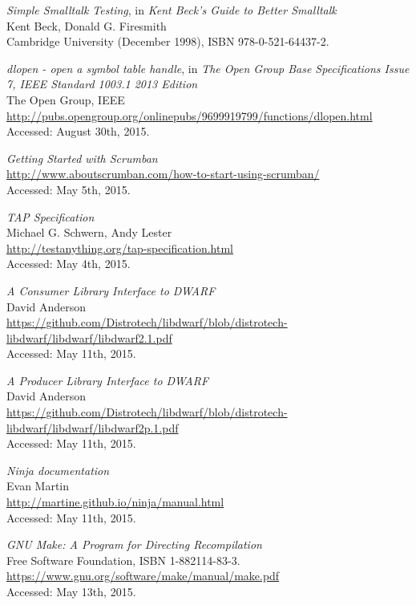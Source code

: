 \begin{thebibliography}{99}
		\emph{Simple Smalltalk Testing}, in \emph{Kent Beck's Guide to Better
		Smalltalk} \\
		Kent Beck, Donald G. Firesmith \\
		Cambridge University (December 1998), ISBN 978-0-521-64437-2.

		\emph{dlopen - open a symbol table handle}, in \emph{The Open Group Base
		Specifications Issue 7, IEEE Standard 1003.1 2013 Edition} \\
		The Open Group, IEEE \\
		\url{http://pubs.opengroup.org/onlinepubs/9699919799/functions/dlopen.html}	\\
		Accessed: August 30th, 2015.

		\emph{Getting Started with Scrumban} \\
		\url{http://www.aboutscrumban.com/how-to-start-using-scrumban/} \\
		Accessed: May 5th, 2015.

		\emph{TAP Specification} \\
		Michael G. Schwern, Andy Lester \\
		\url{http://testanything.org/tap-specification.html} \\
		Accessed: May 4th, 2015.

		\emph{A Consumer Library Interface to DWARF} \\
		David Anderson \\
		\url{https://github.com/Distrotech/libdwarf/blob/distrotech-libdwarf/libdwarf/libdwarf2.1.pdf} \\
		Accessed: May 11th, 2015.

		\emph{A Producer Library Interface to DWARF} \\
		David Anderson \\
		\url{https://github.com/Distrotech/libdwarf/blob/distrotech-libdwarf/libdwarf/libdwarf2p.1.pdf} \\
		Accessed: May 11th, 2015.

		\emph{Ninja documentation} \\
		Evan Martin \\
		\url{http://martine.github.io/ninja/manual.html} \\
		Accessed: May 11th, 2015.

		\emph{GNU Make: A Program for Directing Recompilation} \\
		Free Software Foundation, ISBN 1-882114-83-3. \\
		\url{https://www.gnu.org/software/make/manual/make.pdf} \\
		Accessed: May 13th, 2015.


\end{thebibliography}
